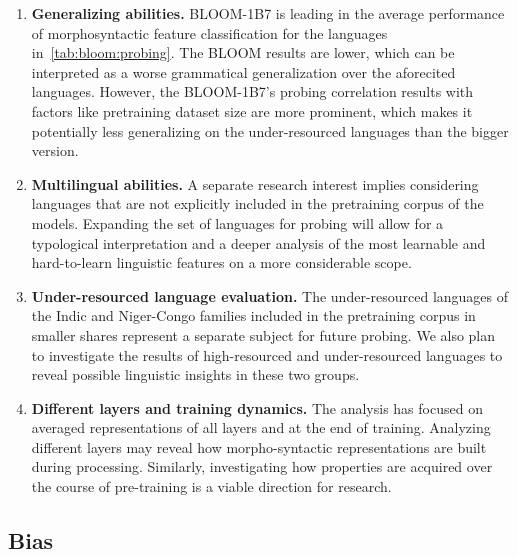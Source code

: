 \begin{enumerate}
    \item \textbf{Generalizing abilities.} BLOOM-1B7 is leading in the average performance of morphosyntactic feature classification for the languages in~\autoref{tab:bloom:probing}. The BLOOM results are lower, which can be interpreted as a worse grammatical generalization over the aforecited languages. However, the BLOOM-1B7's probing correlation results with factors like pretraining dataset size are more prominent, which makes it potentially less generalizing on the under-resourced languages than the bigger version.
    \item \textbf{Multilingual abilities.} A separate research interest implies considering languages that are not explicitly included in the pretraining corpus of the models. Expanding the set of languages for probing will allow for a typological interpretation and a deeper analysis of the most learnable and hard-to-learn linguistic features on a more considerable scope.
    \item \textbf{Under-resourced language evaluation.} The under-resourced languages of the Indic and Niger-Congo families included in the pretraining corpus in smaller shares represent a separate subject for future probing. We also plan to investigate the results of high-resourced and under-resourced languages to reveal possible linguistic insights in these two groups.
    \item \textbf{Different layers and training dynamics.} The analysis has focused on averaged representations of all layers and at the end of training. Analyzing different layers may reveal how morpho-syntactic representations are built during processing. Similarly, investigating how properties are acquired over the course of pre-training  \citep{choshen-etal-2022-grammar,zhang-etal-2021-need,voloshina2022neural} is a viable direction for research. 
\end{enumerate}

\subsection{Bias}

